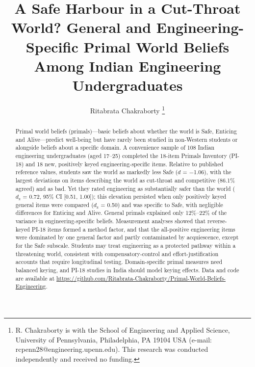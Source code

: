 \documentclass[journal,a4paper]{IEEEtran}
\begin{document}
\title{A Safe Harbour in a Cut-Throat World? General and Engineering-Specific Primal World Beliefs Among Indian Engineering Undergraduates}

\author{Ritabrata Chakraborty%
\thanks{R. Chakraborty is with the School of Engineering and Applied Science, University of Pennsylvania, Philadelphia, PA 19104 USA (e-mail: rcpenn28@engineering.upenn.edu). This research was conducted independently and received no funding.}}


\maketitle

\begin{abstract}
Primal world beliefs (primals)—basic beliefs about whether the world is Safe, Enticing and Alive—predict well-being but have rarely been studied in non-Western students or alongside beliefs about a specific domain. A convenience sample of 108 Indian engineering undergraduates (aged 17–25) completed the 18-item Primals Inventory (PI-18) and 18 new, positively keyed engineering-specific items. Relative to published reference values, students saw the world as markedly less Safe ($d$ = $-$1.06), with the largest deviations on items describing the world as cut-throat and competitive (86.1\% agreed) and as bad. Yet they rated engineering as substantially safer than the world ($d_{\mathrm{z}}$ = 0.72, 95\% CI [0.51, 1.00]); this elevation persisted when only positively keyed general items were compared ($d_{\mathrm{z}}$ = 0.50) and was specific to Safe, with negligible differences for Enticing and Alive. General primals explained only 12\%–22\% of the variance in engineering-specific beliefs. Measurement analyses showed that reverse-keyed PI-18 items formed a method factor, and that the all-positive engineering items were dominated by one general factor and partly contaminated by acquiescence, except for the Safe subscale. Students may treat engineering as a protected pathway within a threatening world, consistent with compensatory-control and effort-justification accounts that require longitudinal testing. Domain-specific primal measures need balanced keying, and PI-18 studies in India should model keying effects. Data and code are available at \url{https://github.com/Ritabrata-Chakraborty/Primal-World-Beliefs-Engineering}.
\end{abstract}
\end{document}
